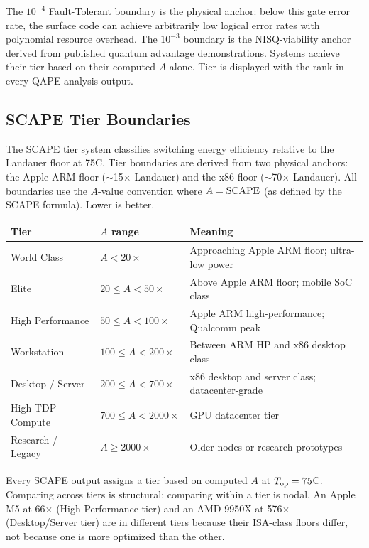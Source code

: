 \documentclass[12pt,a4paper]{article}
\begin{document}
\noindent The $10^{-4}$ Fault-Tolerant boundary is the physical anchor:
below this gate error rate, the surface code can achieve arbitrarily low
logical error rates with polynomial resource overhead. The $10^{-3}$
boundary is the NISQ-viability anchor derived from published
quantum advantage demonstrations. Systems achieve their tier based on their
computed $A$ alone. Tier is displayed with the rank in every QAPE analysis
output.

\subsection{SCAPE Tier Boundaries}
\label{subsec:scape_tiers}

The SCAPE tier system classifies switching energy efficiency relative to
the Landauer floor at 75\textdegree C. Tier boundaries are derived from
two physical anchors: the Apple ARM floor ($\sim$15$\times$ Landauer)
and the x86 floor ($\sim$70$\times$ Landauer). All boundaries use the
$A$-value convention where $A = {\rm SCAPE}$ (as defined by the SCAPE
formula). Lower is better.

\begin{center}
\begin{tabular}{lll}
\toprule
\textbf{Tier} & \textbf{$A$ range} & \textbf{Meaning} \\
\midrule
World Class & $A < 20\times$ & Approaching Apple ARM floor; ultra-low power \\
Elite & $20 \le A < 50\times$ & Above Apple ARM floor; mobile SoC class \\
High Performance & $50 \le A < 100\times$ & Apple ARM high-performance; Qualcomm peak \\
Workstation & $100 \le A < 200\times$ & Between ARM HP and x86 desktop class \\
Desktop / Server & $200 \le A < 700\times$ & x86 desktop and server class; datacenter-grade \\
High-TDP Compute & $700 \le A < 2000\times$ & GPU datacenter tier \\
Research / Legacy & $A \ge 2000\times$ & Older nodes or research prototypes \\
\bottomrule
\end{tabular}
\end{center}

\noindent Every SCAPE output assigns a tier based on computed $A$ at
$T_{\rm op} = 75$\textdegree C. Comparing across tiers is structural;
comparing within a tier is nodal. An Apple M5 at 66$\times$ (High
Performance tier) and an AMD 9950X at 576$\times$ (Desktop/Server
tier) are in different tiers because their ISA-class floors differ,
not because one is more optimized than the other.
\end{document}
